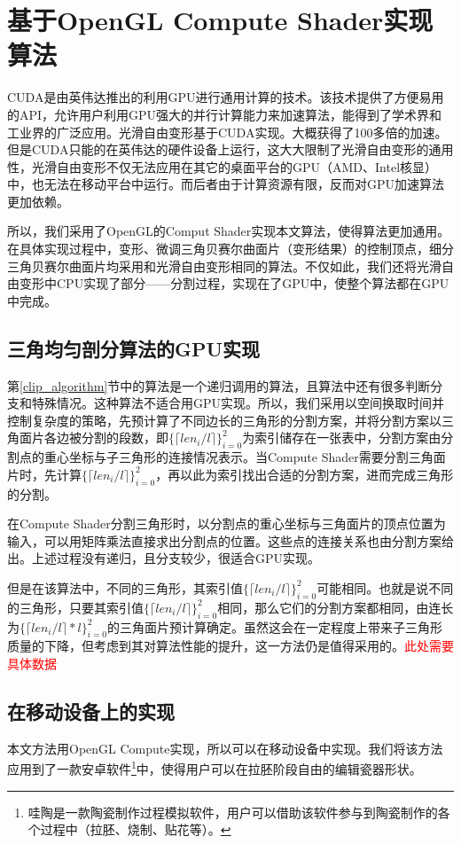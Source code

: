 
\chapter{基于OpenGL Compute Shader实现算法}
CUDA是由英伟达推出的利用GPU进行通用计算的技术。该技术提供了方便易用的API，允许用户利用GPU强大的并行计算能力来加速算法，能得到了学术界和工业界的广泛应用。光滑自由变形\cite{Cui15}基于CUDA实现。大概获得了100多倍的加速。但是CUDA只能的在英伟达的硬件设备上运行，这大大限制了光滑自由变形的通用性，光滑自由变形不仅无法应用在其它的桌面平台的GPU（AMD、Intel核显）中，也无法在移动平台中运行。而后者由于计算资源有限，反而对GPU加速算法更加依赖。

所以，我们采用了OpenGL的Comput Shader实现本文算法，使得算法更加通用。在具体实现过程中，变形、微调三角贝赛尔曲面片（变形结果）的控制顶点，细分三角贝赛尔曲面片均采用和光滑自由变形相同的算法。不仅如此，我们还将光滑自由变形中CPU实现了部分——分割过程，实现在了GPU中，使整个算法都在GPU中完成。

\section{三角均匀剖分算法的GPU实现}
第\autoref{clip_algorithm}节中的算法是一个递归调用的算法，且算法中还有很多判断分支和特殊情况。这种算法不适合用GPU实现。所以，我们采用以空间换取时间并控制复杂度的策略，先预计算了不同边长的三角形的分割方案，并将分割方案以三角面片各边被分割的段数，即$\{\lceil len_i/l \rceil\}^{2}_{i=0}$为索引储存在一张表中，分割方案由分割点的重心坐标与子三角形的连接情况表示。当Compute Shader需要分割三角面片时，先计算$\{\lceil len_i/l \rceil\}^{2}_{i=0}$，再以此为索引找出合适的分割方案，进而完成三角形的分割。

在Compute Shader分割三角形时，以分割点的重心坐标与三角面片的顶点位置为输入，可以用矩阵乘法直接求出分割点的位置。这些点的连接关系也由分割方案给出。上述过程没有递归，且分支较少，很适合GPU实现。

但是在该算法中，不同的三角形，其索引值$\{\lceil len_i/l \rceil\}^{2}_{i=0}$可能相同。也就是说不同的三角形，只要其索引值$\{\lceil len_i/l \rceil\}^{2}_{i=0}$相同，那么它们的分割方案都相同，由连长为$\{\lceil len_i/l \rceil * l\}^{2}_{i=0}$的三角面片预计算确定。虽然这会在一定程度上带来子三角形质量的下降，但考虑到其对算法性能的提升，这一方法仍是值得采用的。\textcolor{red}{此处需要具体数据}


\section{在移动设备上的实现}
本文方法用OpenGL Compute实现，所以可以在移动设备中实现。我们将该方法应用到了一款安卓软件\footnote{哇陶是一款陶瓷制作过程模拟软件，用户可以借助该软件参与到陶瓷制作的各个过程中（拉胚、烧制、贴花等）。}中，使得用户可以在拉胚阶段自由的编辑瓷器形状。

